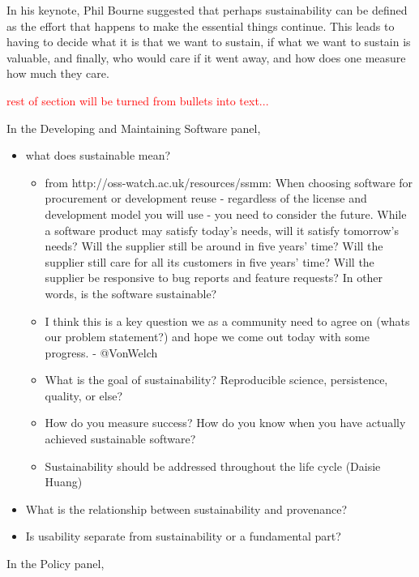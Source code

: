 \documentclass[11pt, oneside]{amsart}
\newcommand{\note}[1]{ {\textcolor{red}    { #1 }}}
\begin{document}
In his keynote, Phil Bourne suggested that perhaps sustainability can be defined
as the effort that happens to make the essential things continue. This leads to
having to decide what it is that we want to sustain, if what we want to sustain is
valuable, and finally, who would care if it went away, and how does one measure
how much they care.

\note{rest of section will be turned from bullets into text...}

In the Developing and Maintaining Software panel,

\begin{itemize}
\item what does sustainable mean?
\begin{itemize}
\item from http://oss-watch.ac.uk/resources/ssmm: When choosing
  software for procurement or development reuse - regardless of the
  license and development model you will use - you need to consider
  the future. While a software product may satisfy today's needs, will
  it satisfy tomorrow's needs? Will the supplier still be around in
  five years' time? Will the supplier still care for all its customers
  in five years' time? Will the supplier be responsive to bug reports
  and feature requests? In other words, is the software sustainable?
\item I think this is a key question we as a community need to agree
  on (whats our problem statement?) and hope we come out today with
  some progress. - @VonWelch
\item What is the goal of sustainability? Reproducible science,
  persistence, quality, or else?
\item How do you measure success? How do you know when you have
  actually achieved sustainable software?
\item Sustainability should be addressed throughout the life cycle
  (Daisie Huang)
\end{itemize}

\item What is the relationship between sustainability and provenance?

\item Is usability separate from sustainability or a fundamental part?
\end{itemize}


In the Policy panel,
\end{document}
